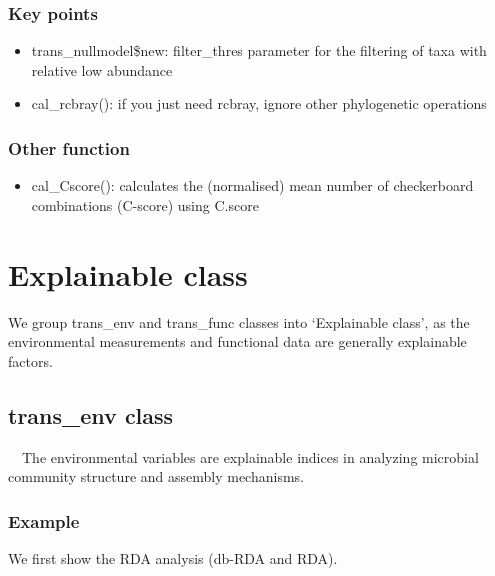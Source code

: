 \documentclass[
]{book}
\providecommand{\tightlist}{%
  \setlength{\itemsep}{0pt}\setlength{\parskip}{0pt}}
\begin{document}
\hypertarget{key-points-7}{%
\subsection{Key points}\label{key-points-7}}

\begin{itemize}
\tightlist
\item
  trans\_nullmodel\$new: filter\_thres parameter for the filtering of taxa with relative low abundance
\item
  cal\_rcbray(): if you just need rcbray, ignore other phylogenetic operations
\end{itemize}

\hypertarget{other-function}{%
\subsection{Other function}\label{other-function}}

\begin{itemize}
\tightlist
\item
  cal\_Cscore(): calculates the (normalised) mean number of checkerboard combinations (C-score) using C.score
\end{itemize}

\hypertarget{explainable-class}{%
\chapter{Explainable class}\label{explainable-class}}

We group trans\_env and trans\_func classes into `Explainable class',
as the environmental measurements and functional data are generally explainable factors.

\hypertarget{trans_env-class}{%
\section{trans\_env class}\label{trans_env-class}}

　The environmental variables are explainable indices in analyzing microbial community structure and assembly mechanisms.

\hypertarget{example-8}{%
\subsection{Example}\label{example-8}}

We first show the RDA analysis (db-RDA and RDA).
\end{document}

